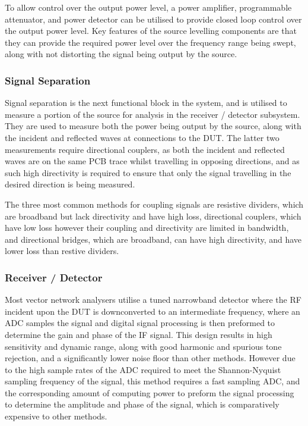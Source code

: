 To allow control over the output power level, a power amplifier, programmable attenuator, and power detector can be utilised to provide closed loop control over the output power level. Key features of the source levelling components are that they can provide the required power level over the frequency range being swept, along with not distorting the signal being output by the source. 

\subsubsection{Signal Separation}
\label{subsubsec:signal seperation}
Signal separation is the next functional block in the system, and is utilised to measure a portion of the source for analysis in the receiver / detector subsystem. They are used to measure both the power being output by the source, along with the incident and reflected waves at connections to the DUT. The latter two measurements require directional couplers, as both the incident and reflected waves are on the same PCB trace whilst travelling in opposing directions, and as such high directivity is required to ensure that only the signal travelling in the desired direction is being measured. 

The three most common methods for coupling signals are resistive dividers, which are broadband but lack directivity and have high loss, directional couplers, which have low loss however their coupling and directivity are limited in bandwidth, and directional bridges, which are broadband, can have high directivity, and have lower loss than restive dividers. 

\subsubsection{Receiver / Detector}
\label{subsubsec: receiver detector}
Most vector network analysers utilise a tuned narrowband detector where the RF incident upon the DUT is downconverted to an intermediate frequency, where an ADC samples the signal and digital signal processing is then preformed to determine the gain and phase of the IF signal. This design results in high sensitivity and dynamic range, along with good harmonic and spurious tone rejection, and a significantly lower noise floor than other methods. However due to the high sample rates of the ADC required to meet the Shannon-Nyquist sampling frequency of the signal, this method requires a fast sampling ADC, and the corresponding amount of computing power to preform the signal processing to determine the amplitude and phase of the signal, which is comparatively expensive to other methods.  

